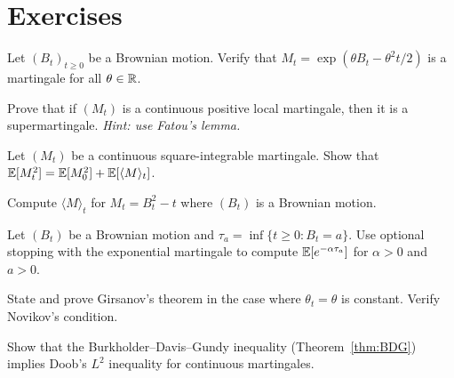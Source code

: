 \section{Exercises}

\begin{exercise}
Let $(B_t)_{t \geq 0}$ be a Brownian motion. Verify that
$M_t = \exp(\theta B_t - \theta^2 t/2)$ is a martingale for all $\theta \in \mathbb{R}$.
\end{exercise}

\begin{exercise}
Prove that if $(M_t)$ is a continuous positive local martingale, then it is a
supermartingale. \emph{Hint: use Fatou's lemma.}
\end{exercise}

\begin{exercise}
Let $(M_t)$ be a continuous square-integrable martingale. Show that
$\mathbb{E}[M_t^2] = \mathbb{E}[M_0^2] + \mathbb{E}[\langle M \rangle_t]$.
\end{exercise}

\begin{exercise}
Compute $\langle M \rangle_t$ for $M_t = B_t^2 - t$ where $(B_t)$ is a
Brownian motion.
\end{exercise}

\begin{exercise}
Let $(B_t)$ be a Brownian motion and $\tau_a = \inf\{t \geq 0 : B_t = a\}$.
Use optional stopping with the exponential martingale to compute
$\mathbb{E}[e^{-\alpha \tau_a}]$ for $\alpha > 0$ and $a > 0$.
\end{exercise}

\begin{exercise}
State and prove Girsanov's theorem in the case where $\theta_t = \theta$ is
constant. Verify Novikov's condition.
\end{exercise}

\begin{exercise}
Show that the Burkholder--Davis--Gundy inequality (Theorem~\ref{thm:BDG})
implies Doob's $L^2$ inequality for continuous martingales.
\end{exercise}
